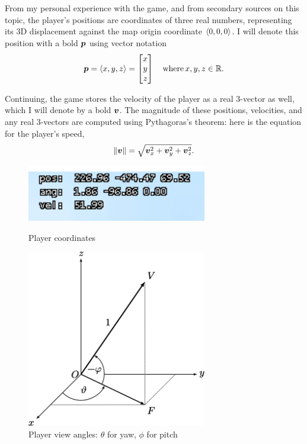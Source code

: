 From my personal experience with the game, and from secondary sources on this topic, the player's positions are coordinates of three real numbers, representing its 3D displacement against the map origin coordinate $\left\langle 0,0,0 \right\rangle$. I will denote this position with a bold $\boldsymbol{p}$ using vector notation
\[
    \boldsymbol{p} = \left\langle x, y, z \right\rangle = \begin{bmatrix}x\\y\\z\end{bmatrix} \quad \text{where} \, x, y, z \in  \mathbb{R}.
\]

Continuing, the game stores the velocity of the player as a real 3-vector as well, which I will denote by a bold $\boldsymbol{v}$. The magnitude of these positions, velocities, and any real 3-vectors are computed using Pythagoras's theorem: here is the equation for the player's speed,
\[
    \|\boldsymbol{v}\| = \sqrt{\boldsymbol{v}_x^2+\boldsymbol{v}_y^2+\boldsymbol{v}_z^2}.
\]

\begin{figure}[H]
    \centering
    \begin{minipage}{.5\textwidth}
        \centering
        \includegraphics[width=0.7\textwidth]{assets/1coords.png}
        \caption[Player Coordinates]{Player coordinates}
        \label{fig:1coords}
    \end{minipage}%
    \begin{minipage}{.5\textwidth}
        \centering
         \includegraphics[width=0.7\textwidth]{assets/viewangles.png}
        \caption[Player View Angles]{Player view angles: $\theta$ for yaw, $\phi$ for pitch\footnotemark}
        \label{fig:view_ang}
    \end{minipage}
\end{figure}


